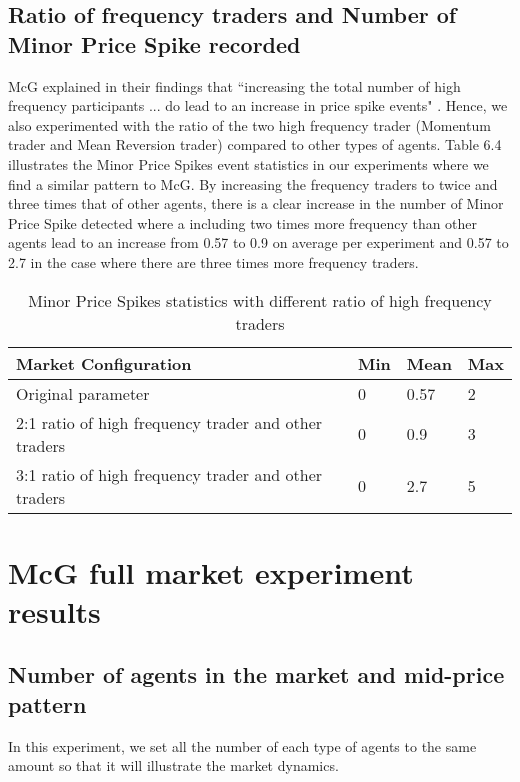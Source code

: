 \subsection{Ratio of frequency traders and Number of Minor Price Spike recorded}
McG explained in their findings that ``increasing the total number of high frequency participants ... do lead to an increase in price spike events" \cite{McGroarty}. Hence, we also experimented with the ratio of the two high frequency trader (Momentum trader and Mean Reversion trader) compared to other types of agents. Table 6.4 illustrates the Minor Price Spikes event statistics in our experiments where we find a similar pattern to McG. By increasing the frequency traders to twice and three times that of other agents, there is a clear increase in the number of Minor Price Spike detected where a including two times more frequency than other agents lead to an increase from 0.57 to 0.9 on average per experiment and 0.57 to 2.7 in the case where there are three times more frequency traders. 

\begin{table}[h]
\centering  
\begin{tabular}{ |m||p{2cm}|p{2cm}|p{2cm}|} 
\hline
\textbf{Market Configuration}& \textbf{ Min } & \textbf{ Mean } & \textbf{ Max}\\
\hline
\hline
Original parameter & 0 & 0.57 & 2 \\ 
\hline
2:1 ratio of high frequency trader and other traders & 0 & 0.9 & 3 \\ 
\hline 
3:1 ratio of high frequency trader and other traders & 0 & 2.7 & 5 \\ 
\hline 
\hline
\end{tabular}
\caption{Minor Price Spikes statistics with different ratio of high frequency traders}  
\end{table}
\FloatBarrier

\newpage
\section{McG full market experiment results}
\subsection{Number of agents in the market and mid-price pattern}
In this experiment, we set all the number of each type of agents to the same amount so that it will illustrate the market dynamics. 

